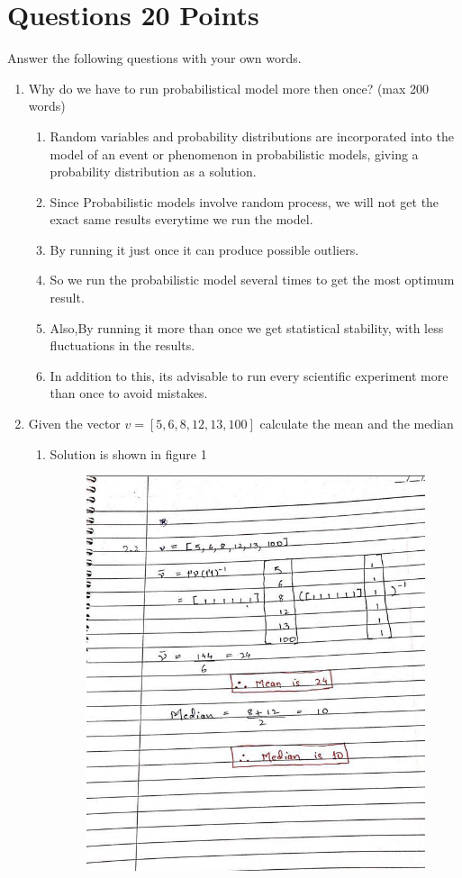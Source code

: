 \documentclass{resources/WeSTassignment}
\begin{document}
\section{Questions \hfill{20 Points}}
Answer the following questions with your own words.  
\begin{enumerate}
    \item Why do we have to run probabilistical model more then once? (max 200 words)
    \begin{enumerate}
    \item Random variables and probability distributions are incorporated into the model of an event or phenomenon in probabilistic models, giving a probability distribution as a solution.
    \item Since Probabilistic models involve random process, we will not get the exact same results everytime we run the model.
	\item By running it just once it can produce possible outliers.
	\item So we run the probabilistic model several times to get the most optimum result.
	\item Also,By running it more than once we get statistical stability, with less fluctuations in the results.
	\item In addition to this, its advisable to run every scientific experiment more than once to avoid mistakes.
	\end{enumerate}
    \item Given the vector $v = [5,6,8,12,13,100]$ calculate the mean and the median
    \begin{enumerate}
    \item Solution is shown in figure 1 \begin{figure}[h]
    \centering
    \includegraphics[scale=0.5]{resources/vector.jpeg}

\end{figure}
\end{enumerate}
\end{enumerate}
\end{document}
